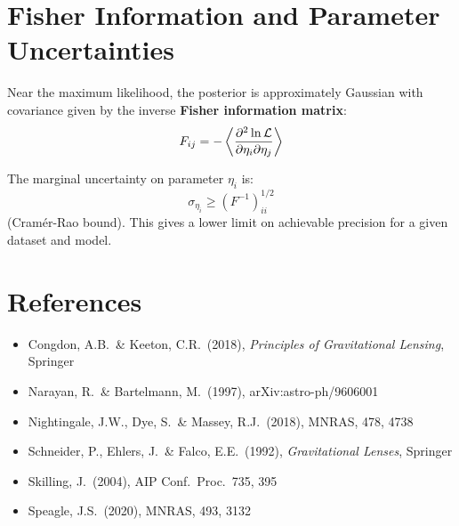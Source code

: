 \documentclass[11pt, letterpaper]{article}
\begin{document}
\section{Fisher Information and Parameter Uncertainties}
\label{sec:fisher}

Near the maximum likelihood, the posterior is approximately Gaussian with
covariance given by the inverse \textbf{Fisher information matrix}:
\begin{equation}
F_{ij} = -\left\langle \frac{\partial^2 \ln\mathcal{L}}{\partial\eta_i \partial\eta_j} \right\rangle
\label{eq:fisher}
\end{equation}

The marginal uncertainty on parameter $\eta_i$ is:
\begin{equation}
\sigma_{\eta_i} \geq (F^{-1})_{ii}^{1/2}
\label{eq:cramer-rao}
\end{equation}
(Cram\'er-Rao bound). This gives a lower limit on achievable precision
for a given dataset and model.

\section*{References}

\begin{itemize}[nosep, leftmargin=*]
  \item Congdon, A.B.\ \& Keeton, C.R.\ (2018), \emph{Principles of Gravitational Lensing}, Springer
  \item Narayan, R.\ \& Bartelmann, M.\ (1997), arXiv:astro-ph/9606001
  \item Nightingale, J.W., Dye, S.\ \& Massey, R.J.\ (2018), MNRAS, 478, 4738
  \item Schneider, P., Ehlers, J.\ \& Falco, E.E.\ (1992), \emph{Gravitational Lenses}, Springer
  \item Skilling, J.\ (2004), AIP Conf.\ Proc.\ 735, 395
  \item Speagle, J.S.\ (2020), MNRAS, 493, 3132
\end{itemize}
\end{document}
